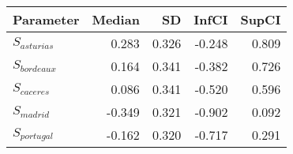 \begin{table}[ht]
\centering
\begin{tabular}{lrrrr}
  \hline
Parameter & Median & SD & InfCI & SupCI \\ 
  \hline
$S_{asturias}$ & 0.283 & 0.326 & -0.248 & 0.809 \\ 
  $S_{bordeaux}$ & 0.164 & 0.341 & -0.382 & 0.726 \\ 
  $S_{caceres}$ & 0.086 & 0.341 & -0.520 & 0.596 \\ 
  $S_{madrid}$ & -0.349 & 0.321 & -0.902 & 0.092 \\ 
  $S_{portugal}$ & -0.162 & 0.320 & -0.717 & 0.291 \\ 
   \hline
\end{tabular}
\end{table}
